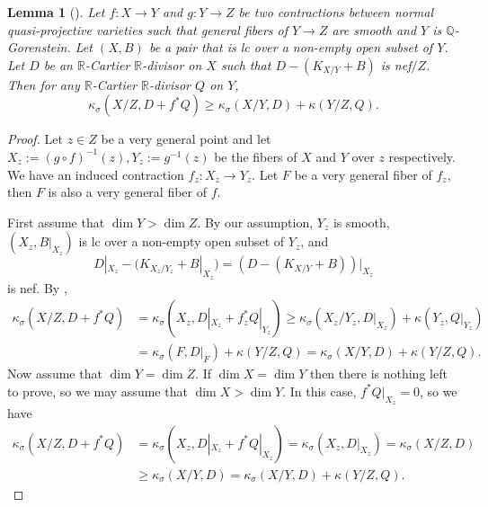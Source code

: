 \documentclass[11pt]{amsart}
\numberwithin{equation}{section}
\newcommand{\Qq}{\mathbb{Q}}
\newcommand{\Rr}{\mathbb{R}}
\newtheorem{lem}[thm]{Lemma}
\theoremstyle{definition}
\theoremstyle{definition}
\theoremstyle{definition}
\begin{document}
\begin{lem}[{\cite[Version 2, Lemma 8.2]{HL21}}]\label{lem: relative subaddivitiy iitaka dimensions}
Let $f: X\rightarrow Y$ and $g: Y\rightarrow Z$ be two contractions between normal quasi-projective varieties such that general fibers of $Y\rightarrow Z$ are smooth and $Y$ is $\Qq$-Gorenstein. Let $(X,B)$ be a pair that is lc over a non-empty open subset of $Y$. Let $D$ be an $\Rr$-Cartier $\Rr$-divisor on $X$ such that $D-(K_{X/Y}+B)$ is nef$/Z$. Then for any $\Rr$-Cartier $\Rr$-divisor $Q$ on $Y$,
$$\kappa_{\sigma}(X/Z,D+f^*Q)\geq\kappa_{\sigma}(X/Y,D)+\kappa(Y/Z,Q).$$
\end{lem}
\begin{proof}
Let $z\in Z$ be a very general point and let $X_z:=(g\circ f)^{-1}(z),Y_z:=g^{-1}(z)$ be the fibers of $X$ and $Y$ over $z$ respectively. We have an induced contraction $f_z: X_z\rightarrow Y_z$. Let $F$ be a very general fiber of $f_z$, then $F$ is also a very general fiber of $f$. 

First assume that $\dim Y>\dim Z$. By our assumption, $Y_z$ is smooth, $(X_z,B|_{X_z})$ is lc over a non-empty open subset of $Y_z$, and
$$D|_{X_z}-(K_{X_z/Y_z}+B|_{X_z})=(D-(K_{X/Y}+B))|_{X_z}$$
is nef. By \cite[(3.3)]{Fuj19},
\begin{align*}
    \kappa_{\sigma}(X/Z,D+f^*Q)&=\kappa_{\sigma}(X_z,D|_{X_z}+f_z^*Q|_{Y_z})\geq \kappa_{\sigma}(X_z/Y_z,D|_{X_z})+\kappa(Y_z,Q|_{Y_z})\\
    &=\kappa_{\sigma}(F,D|_F)+\kappa(Y/Z,Q)=\kappa_{\sigma}(X/Y,D)+\kappa(Y/Z,Q).
\end{align*}
Now assume that $\dim Y=\dim Z$. If $\dim X=\dim Y$ then there is nothing left to prove, so we may assume that $\dim X>\dim Y$. In this case, $f^*Q|_{X_z}=0$, so we have
\begin{align*}
\kappa_{\sigma}(X/Z,D+f^*Q)&=\kappa_{\sigma}(X_z,D|_{X_z}+f^*Q|_{X_z})=\kappa_{\sigma}(X_z,D|_{X_z})= \kappa_{\sigma}(X/Z,D)\\
    &\geq\kappa_{\sigma}(X/Y,D)=\kappa_{\sigma}(X/Y,D)+\kappa(Y/Z,Q).
\end{align*}
\end{proof}
\end{document}
